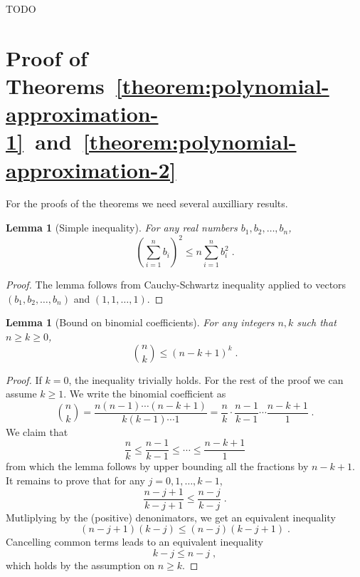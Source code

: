 \documentclass[12pt]{article}
\newtheorem{lemma}[definition]{Lemma}
\begin{document}
TODO

\section{Proof of Theorems~\ref{theorem:polynomial-approximation-1}~and~\ref{theorem:polynomial-approximation-2}}
\label{section:proof-of-polynomial-approximation}

For the proofs of the theorems we need several auxilliary results.

\begin{lemma}[Simple inequality]
\label{lemma:simple-inequality}
For any real numbers $b_1, b_2, \dots, b_n$,
$$
\left( \sum_{i=1}^n b_i \right)^2 \le n \sum_{i=1}^n b_i^2 \; .
$$
\end{lemma}

\begin{proof}
The lemma follows from Cauchy-Schwartz inequality applied to
vectors $(b_1, b_2, \dots, b_n)$ and $(1,1,\dots,1)$.
\end{proof}

\begin{lemma}[Bound on binomial coefficients]
\label{lemma:binomial-bound}
For any integers $n,k$ such that $n \ge k \ge 0$,
$$
\binom{n}{k} \le (n - k + 1)^k \; .
$$
\end{lemma}

\begin{proof}
If $k = 0$, the inequality trivially holds. For the rest of the proof we can
assume $k \ge 1$. We write the binomial coefficient as
$$
\binom{n}{k}
= \frac{n(n-1)\cdots(n-k+1)}{k(k-1) \cdots 1}
= \frac{n}{k} \cdot \frac{n-1}{k - 1} \cdots \frac{n-k+1}{1} \; .
$$
We claim that
$$
\frac{n}{k} \le \frac{n-1}{k - 1} \le \cdots \le \frac{n-k+1}{1}
$$
from which the lemma follows by upper bounding all the fractions by $n-k+1$.
It remains to prove that for any $j=0,1,\dots,k-1$,
$$
\frac{n - j + 1}{k - j + 1} \le \frac{n - j}{k - j} \; .
$$
Mutliplying by the (positive) denonimators, we get an equivalent inequality
$$
(n - j + 1)(k - j) \le (n - j)(k - j + 1) \; .
$$
Cancelling common terms leads to an equivalent inequality
$$
k - j \le n - j \; ,
$$
which holds by the assumption on $n \ge k$.
\end{proof}
\end{document}
